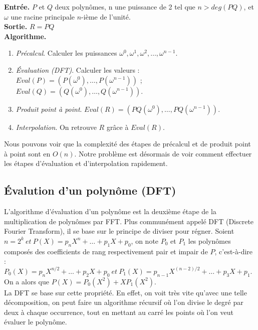 \documentclass[12pt, a4paper]{article}
\begin{document}
\begin{tcolorbox}[colback=cyan!5!white,
                  colframe=cyan!100!black,
                  title=\textbf{Algorithme de multiplication par FFT}
                 ]
\textbf{Entrée.} $P$ et $Q$ deux polynômes, n une puissance de 2 tel que $n>deg(PQ)$, et $\omega$ une racine principale $n$-ième de l’unité. \\
\textbf{Sortie.} $R = PQ$ \\
\textbf{Algorithme.}
\begin{enumerate}[itemsep=-2ex]
\item\textit{Précalcul}. Calculer les puissances $\omega^0,\omega^1,\omega^2,\dots,\omega^{n-1}$. \\
\item\textit{Évaluation (DFT)}. Calculer les valeurs : \\ $Eval(P)=(P(\omega^0),\dots,P(\omega^{n-1}))$ ; $Eval(Q)=(Q(\omega^0),\dots,Q(\omega^{n-1}))$. \\
\item\textit{Produit point à point}. $Eval(R) = (PQ(\omega^0),\dots,PQ(\omega^{n-1}))$. \\
\item\textit{Interpolation}. On retrouve $R$ grâce à $Eval(R)$.
\end{enumerate}
\end{tcolorbox}
Nous pouvons voir que la complexité des étapes de précalcul et de produit point à point sont en $O(n)$. Notre problème est désormais de voir comment effectuer les étapes d'évaluation et d'interpolation rapidement.

\subsection{Évalution d'un polynôme (DFT)}

L'algorithme d'évaluation d'un polynôme est la deuxième étape de la multiplication de polynômes par FFT. Plus communément appelé DFT (Discrete Fourier Transform), il se base sur le principe de diviser pour régner.
Soient $n = 2^k\ et\ P(X) = p_n X^n +\dots+p_1 X + p_0$, on note $P_0$ et $P_1$ les polynômes composés des coefficients de rang respectivement pair et impair de $P$, c'est-à-dire : \\
$P_0(X) = p_{n} X^{n/2} +\dots+ p_2 X + p_0\ et\ P_1(X) = p_{n-1} X^{(n-2)/2} +\dots+ p_3 X + p_1$. \\
On a alors que $P(X) = P_0(X^2)+X P_1(X^2)$. \\
La DFT se base sur cette propriété. En effet, on voit très vite qu'avec une telle décomposition, on peut faire un algorithme récursif où l'on divise le degré par deux à chaque occurrence, tout en mettant au carré les points où l'on veut évaluer le polynôme.
\end{document}
